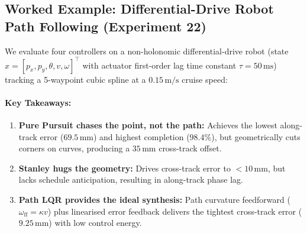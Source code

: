 \documentclass[11pt,a4paper]{article}
\begin{document}
\subsection{Worked Example: Differential-Drive Robot Path Following (Experiment 22)}

We evaluate four controllers on a non-holonomic differential-drive robot (state $x = [p_x, p_y, \theta, v, \omega]^\top$ with actuator first-order lag time constant $\tau = 50\,\text{ms}$) tracking a 5-waypoint cubic spline at a $0.15\,\text{m/s}$ cruise speed:

\begin{table}[H]
\centering
\small
{}
\caption{Benchmark results for Experiment 22: Differential-drive mobile robot path following (from \texttt{experiments/22\_diffdrive\_path\_following/tracking.md}).}
\label{tab:exp22}
\end{table}

\paragraph{Key Takeaways:}
\begin{enumerate}[nosep]
  \item \textbf{Pure Pursuit chases the point, not the path:} Achieves the lowest along-track error ($69.5\,\text{mm}$) and highest completion ($98.4\%$), but geometrically cuts corners on curves, producing a $35\,\text{mm}$ cross-track offset.
  \item \textbf{Stanley hugs the geometry:} Drives cross-track error to $< 10\,\text{mm}$, but lacks schedule anticipation, resulting in along-track phase lag.
  \item \textbf{Path LQR provides the ideal synthesis:} Path curvature feedforward ($\omega_{\text{ff}} = \kappa v$) plus linearised error feedback delivers the tightest cross-track error ($9.25\,\text{mm}$) with low control energy.
\end{enumerate}
\end{document}
